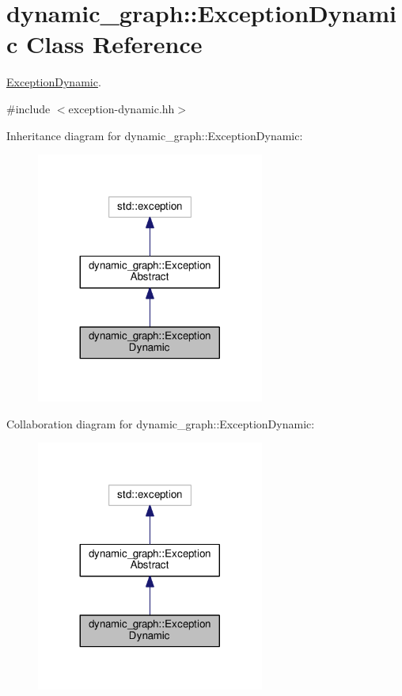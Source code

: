 \hypertarget{classdynamic__graph_1_1ExceptionDynamic}{}\section{dynamic\+\_\+graph\+:\+:Exception\+Dynamic Class Reference}
\label{classdynamic__graph_1_1ExceptionDynamic}


\hyperlink{classdynamic__graph_1_1ExceptionDynamic}{Exception\+Dynamic}.  




{\ttfamily \#include $<$exception-\/dynamic.\+hh$>$}



Inheritance diagram for dynamic\+\_\+graph\+:\+:Exception\+Dynamic\+:
\nopagebreak
\begin{figure}[H]
\begin{center}
\leavevmode
\includegraphics[width=212pt]{classdynamic__graph_1_1ExceptionDynamic__inherit__graph}
\end{center}
\end{figure}


Collaboration diagram for dynamic\+\_\+graph\+:\+:Exception\+Dynamic\+:
\nopagebreak
\begin{figure}[H]
\begin{center}
\leavevmode
\includegraphics[width=212pt]{classdynamic__graph_1_1ExceptionDynamic__coll__graph}
\end{center}
\end{figure}
